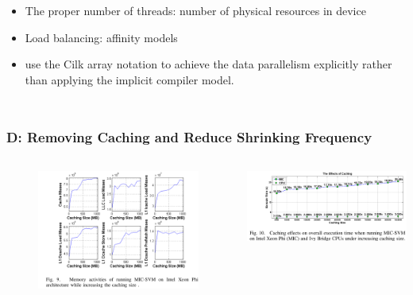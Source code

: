 \documentclass{beamer}
\begin{document}
\begin{frame}
\begin{columns}[c]
		\begin{itemize}
			\item The proper number of threads: number of physical resources in device
			\item Load balancing: affinity models
			\item use the Cilk
			array notation to achieve the data parallelism explicitly rather than
			applying the implicit compiler model.
					
		\end{itemize}	
	\end{columns}	
\end{frame}

\begin{frame}
	\frametitle{D: Removing Caching and Reduce Shrinking Frequency}
	\begin{columns}[c] %
		\begin{figure}
			\includegraphics[width=1\textwidth]{figs/fig9_memorytraits.png}
		\end{figure}
		\includegraphics[width=1\textwidth]{figs/fig10_cache.png}


\end{columns}
\end{frame}
\end{document}

